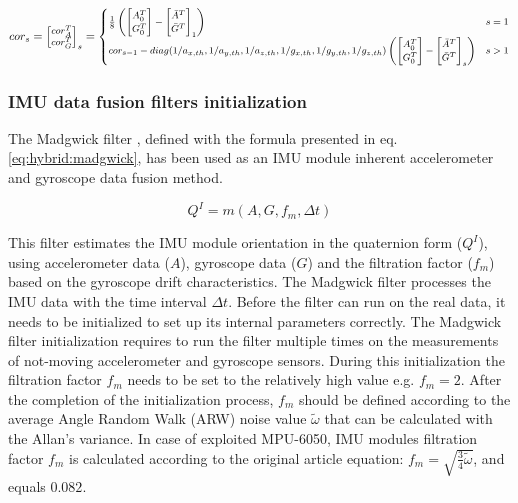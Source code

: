 \documentclass[sensors,article,submit,moreauthors,pdftex,10pt,a4paper]{mdpi}
\begin{document}
	\begin{equation}
		\footnotesize
		cor_s = \begin{bmatrix}cor_A^T\\ cor_G^T\end{bmatrix}_s =
		\begin{cases}
			\frac{1}{8}\left(\begin{bmatrix}A_0^T                                                                          \\ G_0^T\end{bmatrix} - \begin{bmatrix}\bar{A}^T\\ \bar{G}^T\end{bmatrix}_1\right) & s = 1\\
			cor_{s-1} - diag(1/a_{x,th},1/a_{y,th},1/a_{z,th},1/g_{x,th},1/g_{y,th},1/g_{z,th}) \left(\begin{bmatrix}A_0^T \\ G_0^T\end{bmatrix} - \begin{bmatrix}\bar{A}^T\\ \bar{G}^T\end{bmatrix}_s\right) & s > 1
		\end{cases}
		\label{eq:hybrid:IMUCalibration:2}
	\end{equation}	
		
	\subsubsection{IMU data fusion filters initialization}
	The Madgwick filter \cite{Madgwick2011}, defined with the formula presented in eq. \ref{eq:hybrid:madgwick}, has been used as an IMU module inherent accelerometer and gyroscope data fusion method. 
		
	\begin{equation}
		Q^I=m(A,G,f_m,\Delta t)
		\label{eq:hybrid:madgwick}
	\end{equation}
		
	This filter estimates the IMU module orientation in the quaternion form ($Q^I$), using accelerometer data ($A$), gyroscope data ($G$) and the filtration factor ($f_m$) based on the gyroscope drift characteristics. The Madgwick filter processes the IMU data with the time interval $\Delta t$. Before the filter can run on the real data, it needs to be initialized to set up its internal parameters correctly. The Madgwick filter initialization requires to run the filter multiple times on the measurements of not-moving accelerometer and gyroscope sensors. During this initialization the filtration factor $f_m$ needs to be set to the relatively high value e.g. $f_m = 2$. After the completion of the initialization process, $f_m$ should be defined according to the average Angle Random Walk (ARW) noise value $\widetilde{\omega}$ that can be calculated with the Allan’s variance\cite{FreescaleSemiconductor2015,Allan1966,Allan1987}. In case of exploited MPU-6050, IMU modules filtration factor $f_m$ is calculated according to the original article \cite{Madgwick2011} equation: $f_m = \sqrt{\frac{3}{4}\widetilde{\omega}}$, and equals $0.082$. 
		
\end{document}

